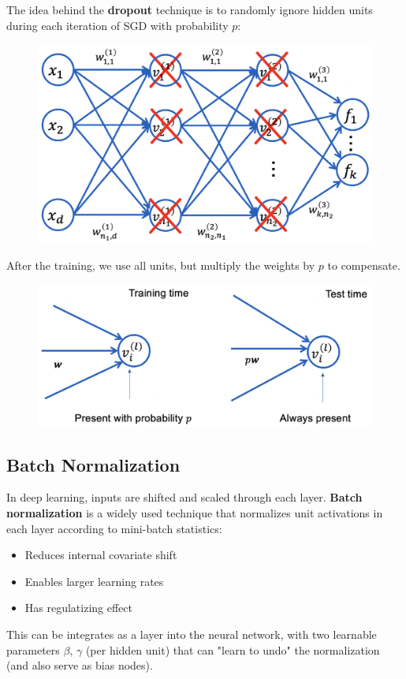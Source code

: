 \documentclass[a4paper]{extarticle}
\begin{document}
The idea behind the \textbf{dropout} technique is to randomly ignore hidden units during each iteration of SGD with probability $p$:

\begin{figure}[H]
    \includegraphics[width=15cm]{../images/IntroML_Fig7-1}
    \centering
\end{figure}

After the training, we use all units, but multiply the weights by $p$ to compensate.

\begin{figure}[H]
    \includegraphics[width=15cm]{../images/IntroML_Fig7-2}
    \centering
\end{figure}

\subsection{Batch Normalization}

In deep learning, inputs are shifted and scaled through each layer. \textbf{Batch normalization} is a widely used technique that normalizes unit activations in each layer according to mini-batch statistics:
\begin{itemize}
    \item Reduces internal covariate shift
    \item Enables larger learning rates
    \item Has regulatizing effect
\end{itemize}
This can be integrates as a layer into the neural network, with two learnable parameters $\beta, \, \gamma$ (per hidden unit) that can "learn to undo" the normalization (and also serve as bias nodes).
\end{document}
